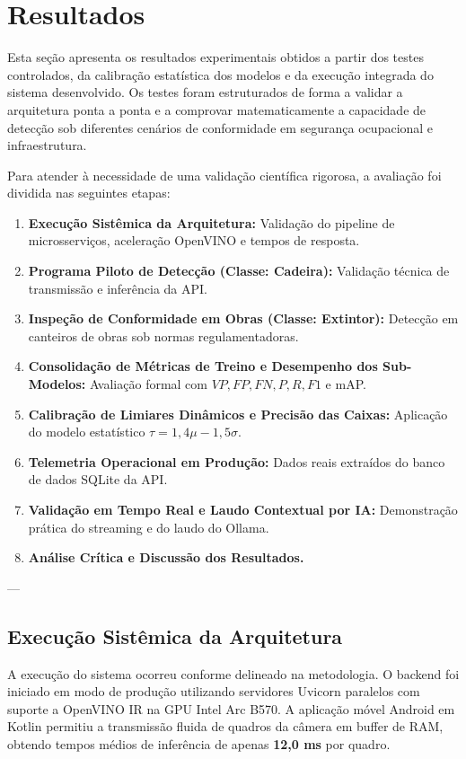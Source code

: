 \chapter{Resultados}
\label{chap:resultados}

Esta seção apresenta os resultados experimentais obtidos a partir dos testes controlados, da calibração estatística dos modelos e da execução integrada do sistema desenvolvido. Os testes foram estruturados de forma a validar a arquitetura ponta a ponta e a comprovar matematicamente a capacidade de detecção sob diferentes cenários de conformidade em segurança ocupacional e infraestrutura.

Para atender à necessidade de uma validação científica rigorosa, a avaliação foi dividida nas seguintes etapas:
\begin{enumerate}
    \item \textbf{Execução Sistêmica da Arquitetura:} Validação do pipeline de microsserviços, aceleração OpenVINO e tempos de resposta.
    \item \textbf{Programa Piloto de Detecção (Classe: Cadeira):} Validação técnica de transmissão e inferência da API.
    \item \textbf{Inspeção de Conformidade em Obras (Classe: Extintor):} Detecção em canteiros de obras sob normas regulamentadoras.
    \item \textbf{Consolidação de Métricas de Treino e Desempenho dos Sub-Modelos:} Avaliação formal com $VP, FP, FN, P, R, F1$ e mAP.
    \item \textbf{Calibração de Limiares Dinâmicos e Precisão das Caixas:} Aplicação do modelo estatístico $\tau = 1,4\mu - 1,5\sigma$.
    \item \textbf{Telemetria Operacional em Produção:} Dados reais extraídos do banco de dados SQLite da API.
    \item \textbf{Validação em Tempo Real e Laudo Contextual por IA:} Demonstração prática do streaming e do laudo do Ollama.
    \item \textbf{Análise Crítica e Discussão dos Resultados.}
\end{enumerate}

---

\section{Execução Sistêmica da Arquitetura}
A execução do sistema ocorreu conforme delineado na metodologia. O backend foi iniciado em modo de produção utilizando servidores Uvicorn paralelos com suporte a OpenVINO IR na GPU Intel Arc B570. A aplicação móvel Android em Kotlin permitiu a transmissão fluida de quadros da câmera em buffer de RAM, obtendo tempos médios de inferência de apenas \textbf{12,0 ms} por quadro.

